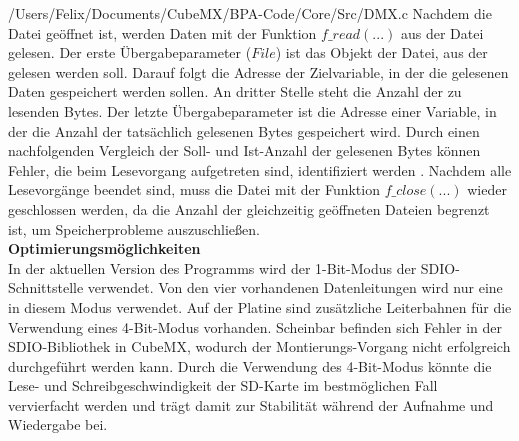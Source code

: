 
{/Users/Felix/Documents/CubeMX/BPA-Code/Core/Src/DMX.c}
Nachdem die Datei geöffnet ist, werden Daten mit der Funktion $f\_read(...)$ aus der Datei gelesen. Der erste Übergabeparameter ($File$) ist das Objekt der Datei, aus der gelesen werden soll. Darauf folgt die Adresse der Zielvariable, in der die gelesenen Daten gespeichert werden sollen. An dritter Stelle steht die Anzahl der zu lesenden Bytes. Der letzte Übergabeparameter ist die Adresse einer Variable, in der die Anzahl der tatsächlich gelesenen Bytes gespeichert wird. Durch einen nachfolgenden Vergleich der Soll- und Ist-Anzahl der gelesenen Bytes können Fehler, die beim Lesevorgang aufgetreten sind, identifiziert werden \cite{FATFS}. Nachdem alle Lesevorgänge beendet sind, muss die Datei mit der Funktion $f\_close(...)$ wieder geschlossen werden, da die Anzahl der gleichzeitig geöffneten Dateien begrenzt ist, um Speicherprobleme auszuschließen.\\
\newline
\textbf{Optimierungsmöglichkeiten}\\
In der aktuellen Version des Programms wird der 1-Bit-Modus der SDIO-Schnittstelle verwendet. Von den vier vorhandenen Datenleitungen wird nur eine in diesem Modus verwendet. Auf der Platine sind zusätzliche Leiterbahnen für die Verwendung eines 4-Bit-Modus vorhanden. Scheinbar befinden sich Fehler in der SDIO-Bibliothek in CubeMX, wodurch der Montierungs-Vorgang nicht erfolgreich durchgeführt werden kann. Durch die Verwendung des 4-Bit-Modus könnte die Lese- und Schreibgeschwindigkeit der SD-Karte im bestmöglichen Fall vervierfacht werden und trägt damit zur Stabilität während der Aufnahme und Wiedergabe bei.